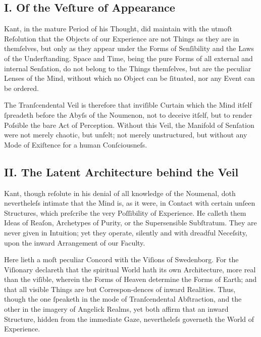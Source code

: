 \documentclass[12pt]{article}
\begin{document}
\subsection*{I. Of the Veſture of Appearance}

Kant, in the mature Period of his Thought, did maintain with the utmoſt 
Reſolution that the Objects of our Experience are not Things as they are in 
themſelves, but only as they appear under the Forms of Senſibility and the 
Laws of the Underſtanding. Space and Time, being the pure Forms of all 
external and internal Senſation, do not belong to the Things themſelves, but 
are the peculiar Lenses of the Mind, without which no Object can be ſituated, 
nor any Event can be ordered.

The Tranſcendental Veil is therefore that inviſible Curtain which the Mind 
itſelf ſpreadeth before the Abyſs of the Noumenon, not to deceive itſelf, but 
to render Poſsible the bare Act of Perception. Without this Veil, the 
Manifold of Senſation were not merely chaotic, but unfelt; not merely 
unstructured, but without any Mode of Exiſtence for a human Conſciousneſs.

\subsection*{II. The Latent Architecture behind the Veil}

Kant, though reſolute in his denial of all knowledge of the Noumenal, doth 
nevertheleſs intimate that the Mind is, as it were, in Contact with certain 
unſeen Structures, which preſcribe the very Poſſibility of Experience. He 
calleth them Ideas of Reaſon, Archetypes of Purity, or the Supersensible 
Subſtratum. They are never given in Intuition; yet they operate, silently and 
with dreadful Neceſsity, upon the inward Arrangement of our Faculty.

Here lieth a moſt peculiar Concord with the Viſions of Swedenborg. For the 
Viſionary declareth that the spiritual World hath its own Architecture, more 
real than the viſible, wherein the Forms of Heaven determine the Forms of 
Earth; and that all visible Things are but Correspon-dences of inward 
Realities. Thus, though the one ſpeaketh in the mode of Tranſcendental 
Abſtraction, and the other in the imagery of Angelick Realms, yet both affirm 
that an inward Structure, hidden from the immediate Gaze, nevertheleſs 
governeth the World of Experience.
\end{document}
